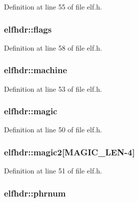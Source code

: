 \-Definition at line 55 of file elf.\-h.

\hypertarget{structelfhdr_a011308d8f1d85aa612b828b00b5e1c4c}{
\subsubsection[{flags}]{ {\bf elfhdr\-::flags}}}\label{structelfhdr_a011308d8f1d85aa612b828b00b5e1c4c}


\-Definition at line 58 of file elf.\-h.

\hypertarget{structelfhdr_a417ec10f6d28d86b531b43fb2ec756c2}{
\subsubsection[{machine}]{ {\bf elfhdr\-::machine}}}\label{structelfhdr_a417ec10f6d28d86b531b43fb2ec756c2}


\-Definition at line 53 of file elf.\-h.

\hypertarget{structelfhdr_a2d862509e1dfe4ba14543e95fa05edb6}{
\subsubsection[{magic}]{ {\bf elfhdr\-::magic}}}\label{structelfhdr_a2d862509e1dfe4ba14543e95fa05edb6}


\-Definition at line 50 of file elf.\-h.

\hypertarget{structelfhdr_a4f962ab58af76d17f532434179917452}{
\subsubsection[{magic2}]{ {\bf elfhdr\-::magic2}\mbox{[}{\bf \-M\-A\-G\-I\-C\-\_\-\-L\-E\-N}-\/4\mbox{]}}}\label{structelfhdr_a4f962ab58af76d17f532434179917452}


\-Definition at line 51 of file elf.\-h.

\hypertarget{structelfhdr_a71e741e84e2cc752e289cc8b7db9f97a}{
\subsubsection[{phrnum}]{ {\bf elfhdr\-::phrnum}}}\label{structelfhdr_a71e741e84e2cc752e289cc8b7db9f97a}


